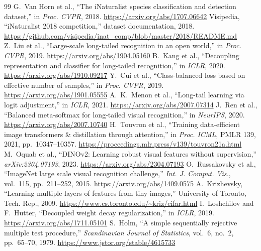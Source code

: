 \documentclass[conference]{IEEEtran}
\begin{document}
\begin{thebibliography}{99}
 G.~Van Horn et al., ``The iNaturalist species classification and detection dataset,'' in \emph{Proc. CVPR}, 2018. \url{https://arxiv.org/abs/1707.06642}
 Visipedia, ``iNaturalist 2018 competition,'' dataset documentation, 2018. \url{https://github.com/visipedia/inat_comp/blob/master/2018/README.md}
 Z.~Liu et al., ``Large-scale long-tailed recognition in an open world,'' in \emph{Proc. CVPR}, 2019. \url{https://arxiv.org/abs/1904.05160}
 B.~Kang et al., ``Decoupling representation and classifier for long-tailed recognition,'' in \emph{ICLR}, 2020. \url{https://arxiv.org/abs/1910.09217}
 Y.~Cui et al., ``Class-balanced loss based on effective number of samples,'' in \emph{Proc. CVPR}, 2019. \url{https://arxiv.org/abs/1901.05555}
 A.~K.~Menon et al., ``Long-tail learning via logit adjustment,'' in \emph{ICLR}, 2021. \url{https://arxiv.org/abs/2007.07314}
 J.~Ren et al., ``Balanced meta-softmax for long-tailed visual recognition,'' in \emph{NeurIPS}, 2020. \url{https://arxiv.org/abs/2007.10740}
 H.~Touvron et al., ``Training data-efficient image transformers \& distillation through attention,'' in \emph{Proc. ICML}, PMLR 139, 2021, pp.~10347--10357. \url{https://proceedings.mlr.press/v139/touvron21a.html}
 M.~Oquab et al., ``DINOv2: Learning robust visual features without supervision,'' \emph{arXiv:2304.07193}, 2023. \url{https://arxiv.org/abs/2304.07193}
 O.~Russakovsky et al., ``ImageNet large scale visual recognition challenge,'' \emph{Int. J. Comput. Vis.}, vol.~115, pp.~211--252, 2015. \url{https://arxiv.org/abs/1409.0575}
 A.~Krizhevsky, ``Learning multiple layers of features from tiny images,'' University of Toronto, Tech. Rep., 2009. \url{https://www.cs.toronto.edu/~kriz/cifar.html}
 I.~Loshchilov and F.~Hutter, ``Decoupled weight decay regularization,'' in \emph{ICLR}, 2019. \url{https://arxiv.org/abs/1711.05101}
 S.~Holm, ``A simple sequentially rejective multiple test procedure,'' \emph{Scandinavian Journal of Statistics}, vol.~6, no.~2, pp.~65--70, 1979. \url{https://www.jstor.org/stable/4615733}


\end{thebibliography}
\end{document}
